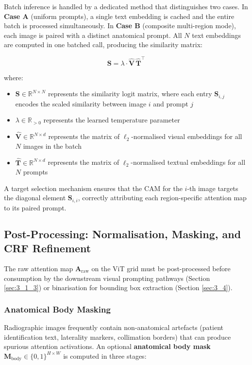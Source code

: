 Batch inference is handled by a dedicated method that distinguishes two cases. In \textbf{Case A} (uniform prompts), a single text embedding is cached and the entire batch is processed simultaneously. In \textbf{Case B} (composite multi-region mode), each image is paired with a distinct anatomical prompt. All $N$ text embeddings are computed in one batched call, producing the similarity matrix:

$$
\mathbf{S} = \lambda \cdot \hat{\mathbf{V}} \, \hat{\mathbf{T}}^{\top}
$$

where:
\begin{itemize}
\item $\mathbf{S} \in \mathbb{R}^{N \times N}$ represents the similarity logit matrix, where each entry $\mathbf{S}_{i,j}$ encodes the scaled similarity between image $i$ and prompt $j$
\item $\lambda \in \mathbb{R}_{>0}$ represents the learned temperature parameter
\item $\hat{\mathbf{V}} \in \mathbb{R}^{N \times d}$ represents the matrix of $\ell_2$-normalised visual embeddings for all $N$ images in the batch
\item $\hat{\mathbf{T}} \in \mathbb{R}^{N \times d}$ represents the matrix of $\ell_2$-normalised textual embeddings for all $N$ prompts
\end{itemize}

A target selection mechanism ensures that the CAM for the $i$-th image targets the diagonal element $\mathbf{S}_{i,i}$, correctly attributing each region-specific attention map to its paired prompt.

\subsection{Post-Processing: Normalisation, Masking, and CRF Refinement}

The raw attention map $\mathbf{A}_{\text{raw}}$ on the ViT grid must be post-processed before consumption by the downstream visual prompting pathways (Section \ref{sec:3_1_3}) or binarisation for bounding box extraction (Section \ref{sec:3_4}).

\subsubsection{Anatomical Body Masking}


Radiographic images frequently contain non-anatomical artefacts (patient identification text, laterality markers, collimation borders) that can produce spurious attention activations. An optional \textbf{anatomical body mask} $\mathbf{M}_{\text{body}} \in \{0, 1\}^{H \times W}$ is computed in three stages:

